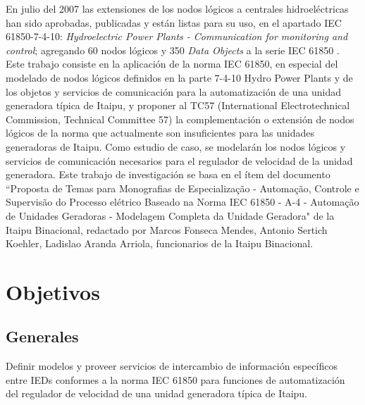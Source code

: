 \documentclass[conference,twocolumn]{IEEEtran}
\begin{document}
En julio del 2007 las extensiones de los nodos l\'ogicos a centrales hidroel\'ectricas han sido aprobadas, publicadas y est\'an listas para su uso, en el apartado IEC 61850-7-4-10: \emph{Hydroelectric Power Plants - Communication for monitoring and control}; agregando 60 nodos l\'ogicos y 350 \emph{Data Objects} a la serie IEC 61850 \cite{IEC61850TC57, Schwarz2008b}.\\

Este trabajo consiste en la aplicaci\'on de la norma IEC 61850, en especial del modelado de nodos l\'ogicos definidos en la parte 7-4-10 Hydro Power Plants y de los objetos y servicios de comunicaci\'on para la automatizaci\'on de una unidad generadora t\'ipica de Itaipu, y proponer al TC57 (International Electrotechnical Commission, Technical Committee 57) la complementaci\'on o extensi\'on de nodos l\'ogicos de la norma que actualmente son insuficientes para las unidades generadoras de Itaipu. Como estudio de caso, se modelar\'an los nodos l\'ogicos y servicios de comunicaci\'on necesarios para el regulador de velocidad de la unidad generadora. Este trabajo de investigaci\'on se basa en el \'item del documento ``Proposta de Temas para Monografias de Especializa\c c\~ao - Automa\c c\~ao, Controle e Supervis\~ao do Processo el\'etrico Baseado na Norma  IEC 61850 -  A-4 - Automa\c c\~ao de Unidades Geradoras - Modelagem Completa da Unidade Geradora" de la Itaipu Binacional, redactado por Marcos Fonseca Mendes, Antonio Sertich Koehler, Ladislao Aranda Arriola, funcionarios de la Itaipu Binacional. 









\section{Objetivos}

	\subsection{Generales}
		Definir modelos y proveer servicios de intercambio de informaci\'on espec\'ificos entre IEDs conformes a la norma IEC 61850 para funciones de automatizaci\'on del regulador de velocidad de una unidad generadora t\'ipica de Itaipu.
\end{document}
